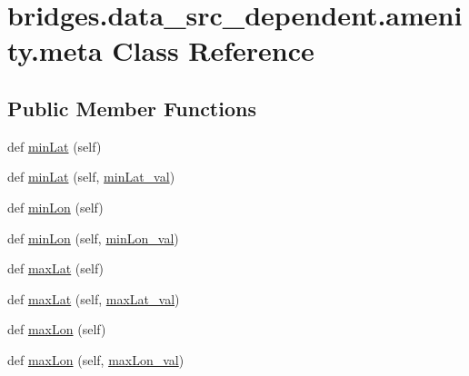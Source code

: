 \hypertarget{classbridges_1_1data__src__dependent_1_1amenity_1_1meta}{}\section{bridges.\+data\+\_\+src\+\_\+dependent.\+amenity.\+meta Class Reference}
\label{classbridges_1_1data__src__dependent_1_1amenity_1_1meta}
\subsection*{Public Member Functions}
\begin{DoxyCompactItemize}
\item 
def \hyperlink{classbridges_1_1data__src__dependent_1_1amenity_1_1meta_a3f1dd4b1f05cfbaacee7fcc19dc88c6f}{min\+Lat} (self)
\item 
def \hyperlink{classbridges_1_1data__src__dependent_1_1amenity_1_1meta_a3ff18c1ae6c61205be351b4e0d6a2a69}{min\+Lat} (self, \hyperlink{classbridges_1_1data__src__dependent_1_1amenity_1_1meta_a7d6af8fd22fd3a1b8e03077926229406}{min\+Lat\+\_\+val})
\item 
def \hyperlink{classbridges_1_1data__src__dependent_1_1amenity_1_1meta_a495c9050ccde44ac0627cbffc35f23c4}{min\+Lon} (self)
\item 
def \hyperlink{classbridges_1_1data__src__dependent_1_1amenity_1_1meta_a4da6915e44892513ad3b07acbb4692a2}{min\+Lon} (self, \hyperlink{classbridges_1_1data__src__dependent_1_1amenity_1_1meta_a9d488c9a1f02cc38f88238968ddd44a9}{min\+Lon\+\_\+val})
\item 
def \hyperlink{classbridges_1_1data__src__dependent_1_1amenity_1_1meta_a4f4f291af53516a76164392074d6b28e}{max\+Lat} (self)
\item 
def \hyperlink{classbridges_1_1data__src__dependent_1_1amenity_1_1meta_a6223589a8853b8908892e6e678ea7f50}{max\+Lat} (self, \hyperlink{classbridges_1_1data__src__dependent_1_1amenity_1_1meta_a17455ecd1b0fba7cebf9fadde1b42bf4}{max\+Lat\+\_\+val})
\item 
def \hyperlink{classbridges_1_1data__src__dependent_1_1amenity_1_1meta_a9e4e7c29793cb9afdea62584761dbe14}{max\+Lon} (self)
\item 
def \hyperlink{classbridges_1_1data__src__dependent_1_1amenity_1_1meta_a7f247dee992af075e7d43ec164a66d2d}{max\+Lon} (self, \hyperlink{classbridges_1_1data__src__dependent_1_1amenity_1_1meta_a90cf7fb57017cb6df689857e0a8a515f}{max\+Lon\+\_\+val})

\end{DoxyCompactItemize}
